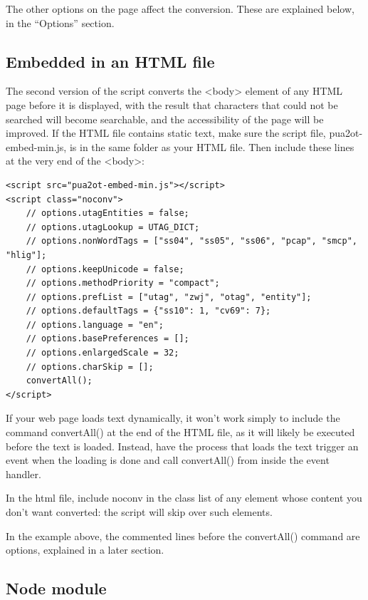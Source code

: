 \documentclass[12pt,letterpaper,openany]{article}
\newcommand\textSourceText[1]{{\color{GGOrange}\textsf{#1}}}
\begin{document}
The other options on the page affect the conversion. These are explained below,
in the “Options” section.

\subsection{Embedded in an HTML file}

The second version of the script converts the {\textless}body{\textgreater}
element of any HTML page before it is displayed, with the result that characters 
that could not be searched will become searchable, and the accessibility of the
page will be improved. If the HTML file contains static text, make sure the 
script file, \textSourceText{pua2ot-embed-min.js}, is
in the same folder as your HTML file. Then include 
these lines at the very end of the {\textless}body{\textgreater}:

\begin{scriptsize}\begin{verbatim}<script src="pua2ot-embed-min.js"></script>
<script class="noconv">
    // options.utagEntities = false;
    // options.utagLookup = UTAG_DICT;
    // options.nonWordTags = ["ss04", "ss05", "ss06", "pcap", "smcp", "hlig"];
    // options.keepUnicode = false;
    // options.methodPriority = "compact";
    // options.prefList = ["utag", "zwj", "otag", "entity"];
    // options.defaultTags = {"ss10": 1, "cv69": 7};
    // options.language = "en";
    // options.basePreferences = [];
    // options.enlargedScale = 32;
    // options.charSkip = [];
    convertAll();
</script>\end{verbatim}\end{scriptsize}

\noindent If your web page loads text dynamically, it won’t work 
simply to include the command \textSourceText{convertAll()} at the end of the 
HTML file, as it will likely be executed before the text is loaded. Instead,
have the process that loads the text trigger an event when the loading is done 
and call \textSourceText{convertAll()} from inside the event handler.

In the html file, include \textSourceText{noconv} in the class list of any element whose
content you don't want converted: the script will skip over such elements.

In the example above, the commented lines before the \textSourceText{convertAll()} 
command are options, explained in a later section.

\subsection{Node module}
\end{document}
